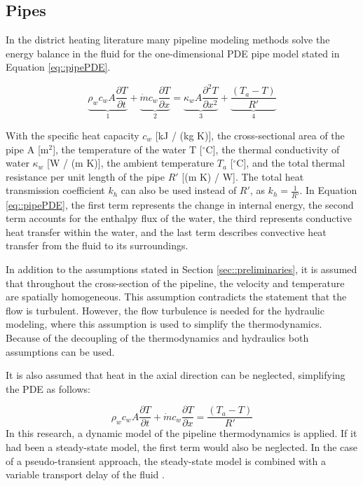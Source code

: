 \subsection{Pipes}\label{sec::thermopipes}
In the district heating literature many pipeline modeling methods solve the energy balance in the fluid for the one-dimensional PDE pipe model stated in  Equation \ref{eq::pipePDE}.

\begin{equation}\label{eq::pipePDE}
\underbrace{\rho_w c_w A \frac{\partial T}{\partial t}}_1+\underbrace{\dot{m} c_w \frac{\partial T}{\partial x}}_2=\underbrace{\kappa_w A \frac{\partial^2 T}{\partial x^2}}_3+\underbrace{\frac{\left(T_a-T\right)}{R'}}_4
\end{equation}

With the specific heat capacity $c_w$ [kJ / (kg K)], the cross-sectional area of the pipe A [m$^2$], the temperature of the water T [$^{\circ}\text{C}$], the thermal conductivity of water $\kappa_w$ [W / (m K)], the ambient temperature $T_a$ [$^{\circ}\text{C}$], and the total thermal resistance per unit length of the pipe $R'$ [(m K) / W]. The total heat transmission coefficient $k_h$ can also be used instead of $R'$, as $k_h = \frac{1}{R'}$. 
In Equation \ref{eq::pipePDE}, the first term represents the change in internal energy, the second term accounts for the enthalpy flux of the water, the third represents conductive heat transfer within the water, and the last term describes convective heat transfer from the fluid to its surroundings.

In addition to the assumptions stated in Section \ref{sec::preliminaries}, it is assumed that throughout the cross-section of the pipeline, the velocity and temperature are spatially homogeneous. This assumption contradicts the statement that the flow is turbulent. However, the flow turbulence is needed for the hydraulic modeling, where this assumption is used to simplify the thermodynamics. Because of the decoupling of the thermodynamics and hydraulics both assumptions can be used. 

It is also assumed that heat in the axial direction can be neglected, simplifying the PDE as follows:

\begin{equation}\label{eq::simpipePDE}
\rho_w c_w A \frac{\partial T}{\partial t} + \dot{m} c_w \frac{\partial T}{\partial x}=\frac{\left(T_a-T\right)}{R'}
\end{equation}
In this research, a dynamic model of the pipeline thermodynamics is applied. If it had been a steady-state model, the first term would also be neglected. In the case of a pseudo-transient approach, the steady-state model is combined with a variable transport delay of the fluid \cite{PipePDE}.

